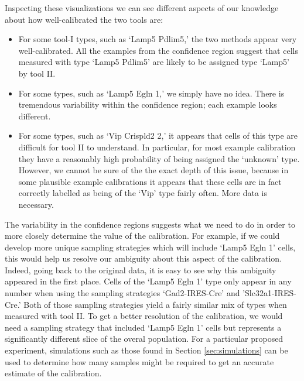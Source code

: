 Inspecting these visualizations we can see different aspects of our knowledge about how well-calibrated the two tools are:
\begin{itemize}
    \item For some tool-I types, such as `Lamp5 Pdlim5,' the two methods appear very well-calibrated.  All the examples from the confidence region suggest that cells measured with type `Lamp5 Pdlim5' are likely to be assigned type `Lamp5' by tool II.
    \item For some types, such as `Lamp5 Egln 1,' we simply have no idea.  There is tremendous variability within the confidence region; each example looks different.  
    \item For some types, such as `Vip Crispld2 2,' it appears that cells of this type are difficult for tool II to understand.  In particular, for most example calibration they have a reasonably high probability of being assigned the  `unknown' type.  However, we cannot be sure of the the exact depth of this issue, because in some plausible example calibrations it appears that these cells are in fact correctly labelled as being of the `Vip' type fairly often.  More data is necessary.  
\end{itemize}
The variability in the confidence regions suggests what we need to do in order to more closely determine the value of the calibration.  For example, if we could develop more unique sampling strategies which will include `Lamp5 Egln 1' cells, this would help us resolve our ambiguity about this aspect of the calibration.  Indeed, going back to the original data, it is easy to see why this ambiguity appeared in the first place.  Cells of the `Lamp5 Egln 1' type only appear in any number when using the sampling strategies `Gad2-IRES-Cre' and 'Slc32a1-IRES-Cre.'  Both of those sampling strategies yield a fairly similar mix of types when measured with tool II.  To get a better resolution of the calibration, we would need a sampling strategy that included `Lamp5 Egln 1' cells but represents a significantly different slice of the overal population.  For a particular proposed experiment, simulations such as those found in Section \ref{sec:simulations} can be used to determine how many samples might be required to get an accurate estimate of the calibration.  



